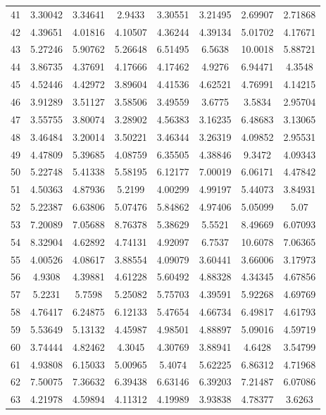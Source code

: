 \begin{center}
\begin{longtable}{cccccccc}
41 & 3.30042 & 3.34641 & 2.9433 & 3.30551 & 3.21495 & 2.69907 & 2.71868\\
42 & 4.39651 & 4.01816 & 4.10507 & 4.36244 & 4.39134 & 5.01702 & 4.17671\\
43 & 5.27246 & 5.90762 & 5.26648 & 6.51495 & 6.5638 & 10.0018 & 5.88721\\
44 & 3.86735 & 4.37691 & 4.17666 & 4.17462 & 4.9276 & 6.94471 & 4.3548\\
45 & 4.52446 & 4.42972 & 3.89604 & 4.41536 & 4.62521 & 4.76991 & 4.14215\\
46 & 3.91289 & 3.51127 & 3.58506 & 3.49559 & 3.6775 & 3.5834 & 2.95704\\
47 & 3.55755 & 3.80074 & 3.28902 & 4.56383 & 3.16235 & 6.48683 & 3.13065\\
48 & 3.46484 & 3.20014 & 3.50221 & 3.46344 & 3.26319 & 4.09852 & 2.95531\\
49 & 4.47809 & 5.39685 & 4.08759 & 6.35505 & 4.38846 & 9.3472 & 4.09343\\
50 & 5.22748 & 5.41338 & 5.58195 & 6.12177 & 7.00019 & 6.06171 & 4.47842\\
51 & 4.50363 & 4.87936 & 5.2199 & 4.00299 & 4.99197 & 5.44073 & 3.84931\\
52 & 5.22387 & 6.63806 & 5.07476 & 5.84862 & 4.97406 & 5.05099 & 5.07\\
53 & 7.20089 & 7.05688 & 8.76378 & 5.38629 & 5.5521 & 8.49669 & 6.07093\\
54 & 8.32904 & 4.62892 & 4.74131 & 4.92097 & 6.7537 & 10.6078 & 7.06365\\
55 & 4.00526 & 4.08617 & 3.88554 & 4.09079 & 3.60441 & 3.66006 & 3.17973\\
56 & 4.9308 & 4.39881 & 4.61228 & 5.60492 & 4.88328 & 4.34345 & 4.67856\\
57 & 5.2231 & 5.7598 & 5.25082 & 5.75703 & 4.39591 & 5.92268 & 4.69769\\
58 & 4.76417 & 6.24875 & 6.12133 & 5.47654 & 4.66734 & 6.49817 & 4.61793\\
59 & 5.53649 & 5.13132 & 4.45987 & 4.98501 & 4.88897 & 5.09016 & 4.59719\\
60 & 3.74444 & 4.82462 & 4.3045 & 4.30769 & 3.88941 & 4.6428 & 3.54799\\
61 & 4.93808 & 6.15033 & 5.00965 & 5.4074 & 5.62225 & 6.86312 & 4.71968\\
62 & 7.50075 & 7.36632 & 6.39438 & 6.63146 & 6.39203 & 7.21487 & 6.07086\\
63 & 4.21978 & 4.59894 & 4.11312 & 4.19989 & 3.93838 & 4.78377 & 3.6263\\

\end{longtable}
\end{center}
